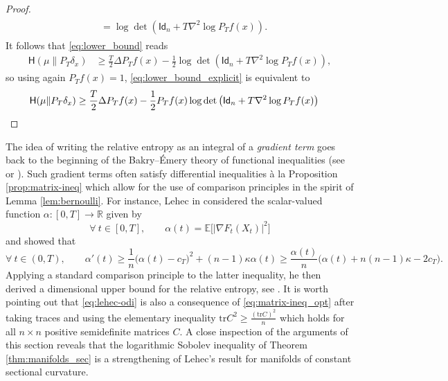 \documentclass[a4paper,twoside,11pt,reqno]{amsart}
\newcommand{\R}{\mathbb{R}} %
\newcommand{\mb}{\mathbb}
\newcommand{\msf}{\mathsf}
\newcommand{\mr}{\mathrm}
\newcommand{\HH}{\mathsf{H}}
\begin{document}
\begin{proof}
\begin{align}
\begin{split}
&=\log\det\left(\msf{Id}_n+T\nabla^2\log P_Tf(x)\right).
\end{split}
\end{align}
It follows that \eqref{eq:lower_bound} reads
\begin{align}\label{eq:lower_bound_explicit}
\HH(\mu \| P_T\delta_x) &\geq \frac{T}{2}\Delta P_Tf(x) -\frac{1}{2}\log\det\left(\msf{Id}_n+T\nabla^2\log P_Tf(x)\right),
\end{align}
so using again $P_Tf(x)=1$, \eqref{eq:lower_bound_explicit} is equivalent to
\begin{align*}
\HH(\mu \| P_T\delta_x) &\geq \frac{T}{2}\Delta P_Tf(x) -\frac{1}{2}P_Tf(x)\log\det\left(\msf{Id}_n+T\nabla^2\log P_Tf(x)\right)\qedhere
\end{align*}
\end{proof}

 The idea of writing the relative entropy as an integral  of a \emph{gradient term} goes back to the beginning of the Bakry--\'Emery theory of functional inequalities (see \cite{BE85,Bak94} or \cite[Section~5.5]{BGL14}). Such gradient terms often satisfy differential inequalities \`a la Proposition \ref{prop:matrix-ineq} which allow for the use of comparison principles in the spirit of Lemma \ref{lem:bernoulli}. For instance, Lehec in \cite{Leh17} considered the scalar-valued function $\alpha:[0,T]\to \R$ given by
\begin{equation}
\forall \ t\in[0,T],\qquad \alpha(t) = \mb{E}\big[ |\nabla F_t(X_t)|^2 \big]
\end{equation}
and showed that
\begin{equation} \label{eq:lehec-odi}
\forall \ t\in(0,T), \qquad \alpha'(t) \geq \frac{1}{n} \big( \alpha(t)-c_T\big)^2+(n-1)\kappa \alpha(t) \geq \frac{\alpha(t)}{n}\big( \alpha(t) + n(n-1)\kappa - 2c_T\big).
\end{equation}
Applying a standard comparison principle to the latter inequality, he then derived a dimensional upper bound for the relative entropy, see \cite[Equation~(25)]{Leh17}. It is worth pointing out that \eqref{eq:lehec-odi} is also a consequence of \eqref{eq:matrix-ineq_opt} after taking traces and using the elementary inequality $\mr{tr}C^2 \geq \tfrac{(\mr{tr}C)^2}{n}$ which holds for all $n\times n$ positive semidefinite matrices $C$. A close inspection of the arguments of this section reveals that the logarithmic Sobolev inequality of Theorem \ref{thm:manifolds_sec} is a strengthening of Lehec's result for manifolds of constant sectional curvature.
\end{document}
